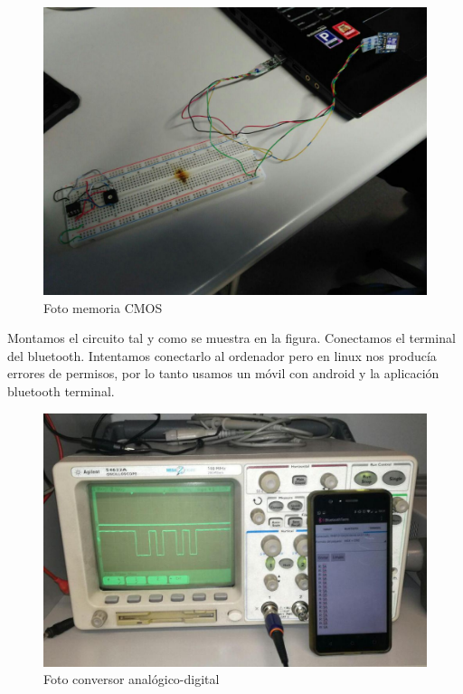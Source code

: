 \documentclass[paper=a4, fontsize=11pt]{scrartcl} %
\numberwithin{equation}{section} %
\numberwithin{figure}{section} %
\numberwithin{table}{section} %
\begin{document}
\begin{figure}[H]
	\centering
	\includegraphics[scale=0.4]{image/prac7A}
	\caption{Foto memoria CMOS}
	\label{fig:prac-5a-7B}
\end{figure}

Montamos el circuito tal y como se muestra en la figura. Conectamos el terminal del bluetooth. Intentamos conectarlo al ordenador pero en linux nos producía errores de permisos, por lo tanto usamos un móvil con android y la aplicación bluetooth terminal. \newline

\begin{figure}[H]
	\centering
	\includegraphics[scale=0.6]{image/prac71}
	\caption{Foto conversor analógico-digital}
	\label{fig:prac-5a-71}
\end{figure}
\end{document}
